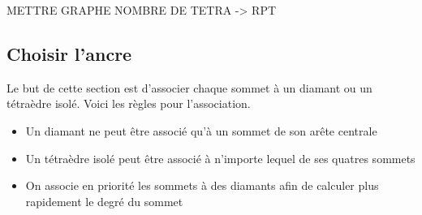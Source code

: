 \documentclass[a4paper,11pt,openany]{article}
\begin{document}
METTRE GRAPHE NOMBRE DE TETRA -> RPT

\subsection{Choisir l'ancre}
\noindent
Le but de cette section est d'associer chaque sommet à un diamant ou un tétraèdre isolé. Voici les règles pour l'association.\\
\begin{itemize}
\item Un diamant ne peut être associé qu'à un sommet de son arête centrale
\item Un tétraèdre isolé peut être associé à n'importe lequel de ses quatres sommets
\item On associe en priorité les sommets à des diamants afin de calculer plus rapidement le degré du sommet
\end{itemize}
\end{document}
